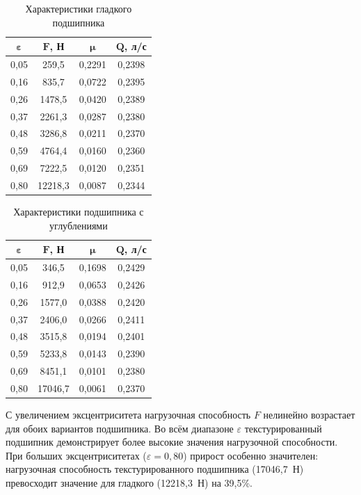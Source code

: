 \begin{table}[H]
\small
\centering
\caption{Характеристики гладкого подшипника}
\label{tab:smooth_results}
\begin{tabular}{|c|c|c|c|}
\hline
$\boldsymbol{\varepsilon}$ & $\boldsymbol{F}$\textbf{, Н} & $\boldsymbol{\mu}$ & $\boldsymbol{Q}$\textbf{, л/с} \\
\hline
0{,}05 & 259{,}5 & 0{,}2291 & 0{,}2398 \\
\hline
0{,}16 & 835{,}7 & 0{,}0722 & 0{,}2395 \\
\hline
0{,}26 & 1478{,}5 & 0{,}0420 & 0{,}2389 \\
\hline
0{,}37 & 2261{,}3 & 0{,}0287 & 0{,}2380 \\
\hline
0{,}48 & 3286{,}8 & 0{,}0211 & 0{,}2370 \\
\hline
0{,}59 & 4764{,}4 & 0{,}0160 & 0{,}2360 \\
\hline
0{,}69 & 7222{,}5 & 0{,}0120 & 0{,}2351 \\
\hline
0{,}80 & 12218{,}3 & 0{,}0087 & 0{,}2344 \\
\hline
\end{tabular}
\end{table}

\begin{table}[H]
\small
\centering
\caption{Характеристики подшипника с \varDimpleTypeGenitive{} углублениями}
\label{tab:textured_results}
\begin{tabular}{|c|c|c|c|}
\hline
$\boldsymbol{\varepsilon}$ & $\boldsymbol{F}$\textbf{, Н} & $\boldsymbol{\mu}$ & $\boldsymbol{Q}$\textbf{, л/с} \\
\hline
0{,}05 & 346{,}5 & 0{,}1698 & 0{,}2429 \\
\hline
0{,}16 & 912{,}9 & 0{,}0653 & 0{,}2426 \\
\hline
0{,}26 & 1577{,}0 & 0{,}0388 & 0{,}2420 \\
\hline
0{,}37 & 2406{,}0 & 0{,}0266 & 0{,}2411 \\
\hline
0{,}48 & 3515{,}8 & 0{,}0194 & 0{,}2401 \\
\hline
0{,}59 & 5233{,}8 & 0{,}0143 & 0{,}2390 \\
\hline
0{,}69 & 8451{,}1 & 0{,}0101 & 0{,}2380 \\
\hline
0{,}80 & 17046{,}7 & 0{,}0061 & 0{,}2370 \\
\hline
\end{tabular}
\end{table}

С увеличением эксцентриситета нагрузочная способность $F$ нелинейно возрастает для обоих вариантов подшипника. Во всём диапазоне $\varepsilon$ текстурированный подшипник демонстрирует более высокие значения нагрузочной способности. При больших эксцентриситетах ($\varepsilon = 0{,}80$) прирост особенно значителен: нагрузочная способность текстурированного подшипника (17046{,}7~Н) превосходит значение для гладкого (12218{,}3~Н) на 39{,}5\%.

